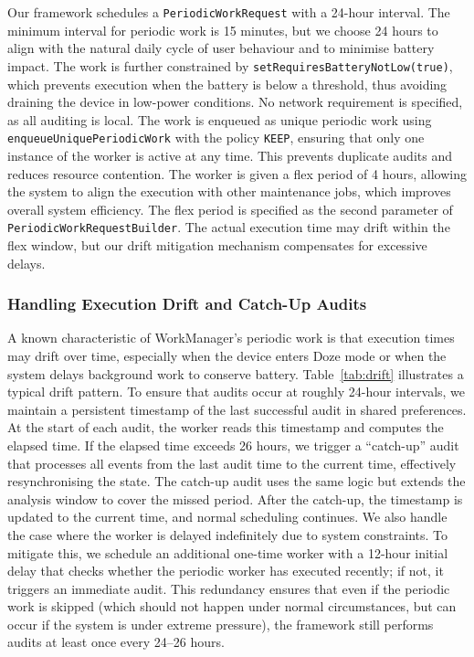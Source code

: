 Our framework schedules a \texttt{PeriodicWorkRequest} with a 24-hour interval. The minimum interval for periodic work is 15 minutes, but we choose 24 hours to align with the natural daily cycle of user behaviour and to minimise battery impact. The work is further constrained by \texttt{setRequiresBatteryNotLow(true)}, which prevents execution when the battery is below a threshold, thus avoiding draining the device in low-power conditions. No network requirement is specified, as all auditing is local. The work is enqueued as unique periodic work using \texttt{enqueueUniquePeriodicWork} with the policy \texttt{KEEP}, ensuring that only one instance of the worker is active at any time. This prevents duplicate audits and reduces resource contention. The worker is given a flex period of 4 hours, allowing the system to align the execution with other maintenance jobs, which improves overall system efficiency. The flex period is specified as the second parameter of \texttt{PeriodicWorkRequestBuilder}. The actual execution time may drift within the flex window, but our drift mitigation mechanism compensates for excessive delays.

\subsubsection{Handling Execution Drift and Catch-Up Audits}

A known characteristic of WorkManager's periodic work is that execution times may drift over time, especially when the device enters Doze mode or when the system delays background work to conserve battery. Table~\ref{tab:drift} illustrates a typical drift pattern. To ensure that audits occur at roughly 24-hour intervals, we maintain a persistent timestamp of the last successful audit in shared preferences. At the start of each audit, the worker reads this timestamp and computes the elapsed time. If the elapsed time exceeds 26 hours, we trigger a ``catch-up'' audit that processes all events from the last audit time to the current time, effectively resynchronising the state. The catch-up audit uses the same logic but extends the analysis window to cover the missed period. After the catch-up, the timestamp is updated to the current time, and normal scheduling continues. We also handle the case where the worker is delayed indefinitely due to system constraints. To mitigate this, we schedule an additional one-time worker with a 12-hour initial delay that checks whether the periodic worker has executed recently; if not, it triggers an immediate audit. This redundancy ensures that even if the periodic work is skipped (which should not happen under normal circumstances, but can occur if the system is under extreme pressure), the framework still performs audits at least once every 24–26 hours.


